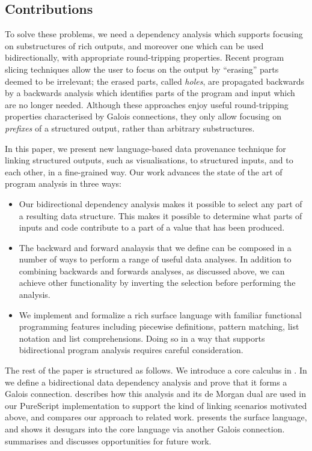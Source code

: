\subsection{Contributions}

To solve these problems, we need a dependency analysis which supports focusing on substructures of rich outputs, and moreover one which can be used bidirectionally, with appropriate round-tripping properties. Recent program slicing techniques \cite{perera12a,perera13a,ricciotti17} allow the user to focus on the output by ``erasing'' parts deemed to be irrelevant; the erased parts, called \emph{holes}, are propagated backwards by a backwards analysis which identifies parts of the program and input which are no longer needed. Although these approaches enjoy useful round-tripping properties characterised by Galois connections, they only allow focusing on \emph{prefixes} of a structured output, rather than arbitrary substructures.

In this paper, we present new language-based data provenance technique for linking structured outputs, such as visualisations, to structured inputs, and to each other, in a fine-grained way. Our work advances the state of the art of program analysis in three ways:

\begin{itemize}
\item Our bidirectional dependency analysis makes it possible to select any part of a resulting data structure. This makes it possible to determine what parts of inputs and code contribute to a part of a value that has been produced.
\item The backward and forward analaysis that we define can be composed in a number of ways to perform a range of useful data analyses. In addition to combining backwards and forwards analyses, as discussed above, we can achieve other functionality by inverting the selection before performing the analysis.
\item We implement and formalize a rich surface language with familiar functional programming features including piecewise definitions, pattern matching, list notation and list comprehensions. Doing so in a way that supports bidirectional program analysis requires careful consideration.
\end{itemize}

\noindent The rest of the paper is structured as follows. We introduce a core calculus in . In  we define a bidirectional data dependency analysis and prove that it forms a Galois connection.  describes how this analysis and its de Morgan dual are used in our PureScript implementation to support the kind of linking scenarios motivated above, and compares our approach to related work.  presents the surface language, and shows it desugars into the core language via another Galois connection.  summarises and discusses opportunities for future work.

